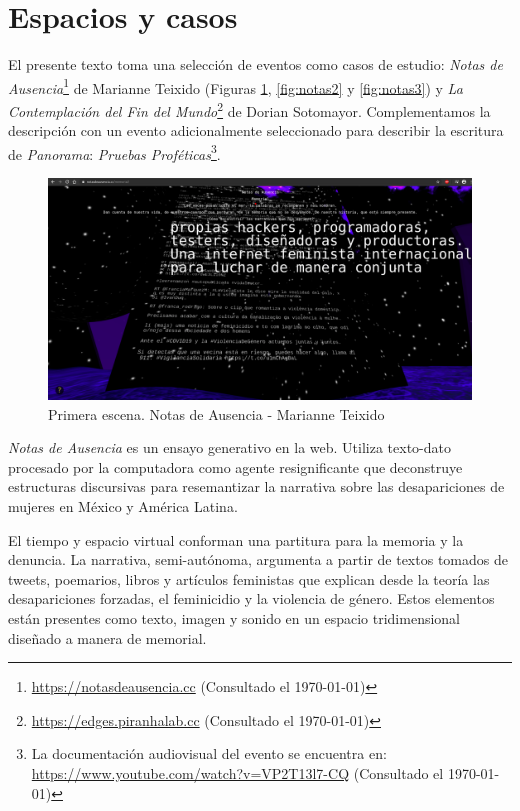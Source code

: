 
\section*{Espacios y casos} %

El presente texto toma una selección de eventos como casos de estudio: \textit{Notas de Ausencia}\footnote{\url{https://notasdeausencia.cc} (Consultado el \today)} de Marianne Teixido (Figuras \ref{fig:notas1}, \ref{fig:notas2} y \ref{fig:notas3}) y \textit{La Contemplación del Fin del Mundo}\footnote{\url{https://edges.piranhalab.cc} (Consultado el \today)} de Dorian Sotomayor. Complementamos la descripción con un evento adicionalmente seleccionado para describir la escritura de \textit{Panorama}: \textit{Pruebas Proféticas}\footnote{La documentación audiovisual del evento se encuentra en: \url{https://www.youtube.com/watch?v=VP2T13l7-CQ} (Consultado el \today)}. %

\begin{figure}
  \includegraphics[width=\textwidth]{img/notas02.png}
  \caption{Primera escena. Notas de Ausencia - Marianne Teixido}
  \label{fig:notas1}
\end{figure}


\emph{Notas de Ausencia} es un ensayo generativo en la web. Utiliza texto-dato procesado por la computadora como agente resignificante que deconstruye estructuras discursivas para resemantizar la narrativa sobre las desapariciones de mujeres en México y América Latina.

El tiempo y espacio virtual conforman una partitura para la memoria y la denuncia. La narrativa, semi-autónoma, argumenta a partir de textos tomados de tweets, poemarios, libros y artículos feministas que explican desde la teoría las desapariciones forzadas, el feminicidio y la violencia de género. Estos elementos están presentes como texto, imagen y sonido en un espacio tridimensional diseñado a manera de memorial.

